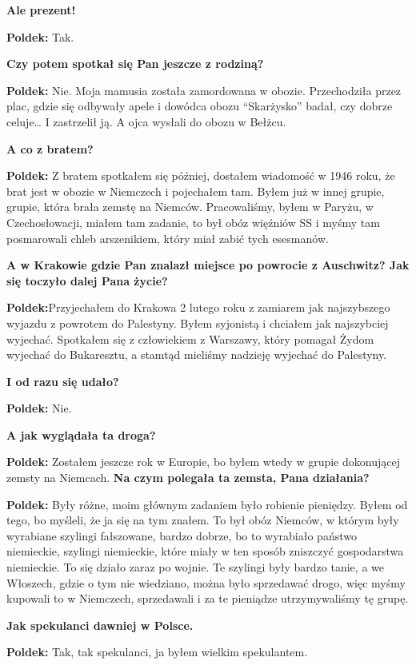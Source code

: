 \begin{otherlanguage}{polish}
\textbf{Ale prezent!}
 
\textbf{Poldek:} Tak.
   
\textbf{Czy potem spotkał się Pan jeszcze z rodziną?}

\textbf{Poldek:} Nie. Moja mamusia została zamordowana w obozie. Przechodziła przez plac, gdzie się odbywały apele i dowódca obozu "`Skarżysko"' badał, czy dobrze celuje… I zastrzelił ją. A ojca wysłali do obozu w Bełżcu.

\textbf{A co z bratem?}

\textbf{Poldek:}  Z bratem spotkałem się później, dostałem wiadomość w 1946 roku, że brat jest w obozie w Niemczech i pojechałem tam. Byłem już w innej grupie, grupie, która brała zemstę na Niemców. Pracowaliśmy, byłem w Paryżu, w Czechosłowacji, miałem tam zadanie, to był obóz więźniów SS i myśmy tam posmarowali chleb arszenikiem, który miał zabić tych esesmanów.

\textbf{A w Krakowie gdzie Pan znalazł miejsce po powrocie z Auschwitz? Jak się toczyło dalej Pana życie?}

\textbf{Poldek:}Przyjechałem do Krakowa 2 lutego roku z zamiarem jak najszybszego wyjazdu z powrotem do Palestyny. Byłem syjonistą i chciałem jak najszybciej wyjechać. Spotkałem się z człowiekiem z Warszawy, który pomagał Żydom wyjechać do Bukaresztu, a stamtąd mieliśmy nadzieję wyjechać do Palestyny.

\textbf{I od razu się udało?}

\textbf{Poldek:} Nie.
 
\textbf{A jak wyglądała ta droga?}

\textbf{Poldek:} Zostałem jeszcze rok w Europie, bo byłem wtedy w grupie dokonującej zemsty na Niemcach.
\textbf{Na czym polegała ta zemsta, Pana działania?}
 
\textbf{Poldek:} Były różne, moim głównym zadaniem było robienie pieniędzy. Byłem od tego, bo myśleli, że ja się na tym znałem. To był obóz Niemców, w którym były wyrabiane szylingi fałszowane, bardzo dobrze, bo to wyrabiało państwo niemieckie, szylingi niemieckie, które miały w ten sposób zniszczyć gospodarstwa niemieckie. To się działo zaraz po wojnie. Te szylingi były bardzo tanie, a we Włoszech, gdzie o tym nie wiedziano, można było sprzedawać drogo, więc myśmy kupowali to w Niemczech, sprzedawali i za te pieniądze utrzymywaliśmy tę grupę.
 
\textbf{Jak spekulanci dawniej w Polsce.}
  
\textbf{Poldek:} Tak, tak spekulanci, ja byłem wielkim spekulantem.
  

\end{otherlanguage}
